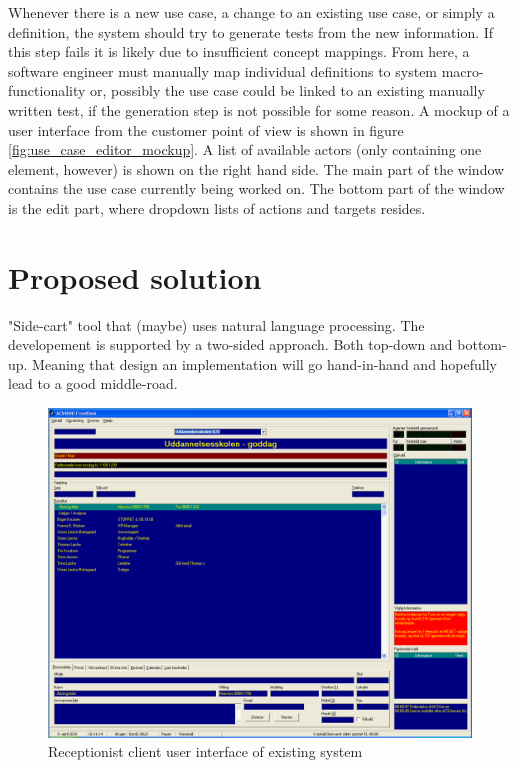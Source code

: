 Whenever there is a new use case, a change to an existing use case, or simply a definition, the system should try to generate tests from the new information. If this step fails it is likely due to insufficient concept mappings. From here, a software engineer must manually map individual definitions to system macro-functionality or, possibly the use case could be linked to an existing manually written test, if the generation step is not possible for some reason. A mockup of a user interface from the customer point of view is shown in figure \ref{fig:use_case_editor_mockup}. A list of available actors (only containing one element, however) is shown on the right hand side. The main part of the window contains the use case currently being worked on. The bottom part of the window is the edit part, where dropdown lists of actions and targets resides.

%

\section{Proposed solution}
"Side-cart" tool that (maybe) uses natural language processing. The developement is supported by a two-sided approach. Both top-down and bottom-up. Meaning that design an implementation will go hand-in-hand and hopefully lead to a good middle-road.


\begin{figure}
  \centering
 
  \includegraphics[scale=0.2]{img/frontdesk-client-ui.png}
  \caption{Receptionist client user interface of existing system}
  \label{fig:frontdesk-client-ui}
\end{figure}

